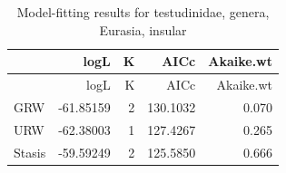 \begin{longtable}[]{@{}lrrrr@{}}
	\caption{Model-fitting results for testudinidae, genera, Eurasia,
		insular}
	\label{tab:pTSEsI}
	\tabularnewline
	\toprule
	& logL & K & AICc & Akaike.wt\tabularnewline
	\midrule
	\endfirsthead
	\toprule
	& logL & K & AICc & Akaike.wt\tabularnewline
	\midrule
	\endhead
	GRW & -61.85159 & 2 & 130.1032 & 0.070\tabularnewline
	URW & -62.38003 & 1 & 127.4267 & 0.265\tabularnewline
	Stasis & -59.59249 & 2 & 125.5850 & 0.666\tabularnewline
	\bottomrule
\end{longtable}


\FloatBarrier






